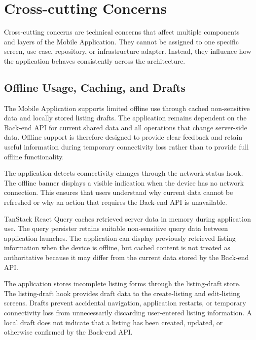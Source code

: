 \section{Cross-cutting Concerns}
\label{sec:cross-cutting-concerns}
Cross-cutting concerns are technical concerns that affect multiple components and layers of the \tradesq{} Mobile Application.
They cannot be assigned to one specific screen, use case, repository, or infrastructure adapter.
Instead, they influence how the application behaves consistently across the architecture.

\subsection{Offline Usage, Caching, and Drafts}
\label{sec:offline}

The \tradesq{} Mobile Application supports limited offline use through cached non-sensitive data and locally stored listing drafts.
The application remains dependent on the \tradesq{} Back-end API for current shared data and all operations that change server-side data.
Offline support is therefore designed to provide clear feedback and retain useful information during temporary connectivity loss rather than to provide full offline functionality.

The application detects connectivity changes through the network-status hook.
The offline banner displays a visible indication when the device has no network connection.
This ensures that users understand why current data cannot be refreshed or why an action that requires the Back-end API is unavailable.

TanStack React Query caches retrieved server data in memory during application use.
The query persister retains suitable non-sensitive query data between application launches.
The application can display previously retrieved listing information when the device is offline, but cached content is not treated as authoritative because it may differ from the current data stored by the \tradesq{} Back-end API.

The application stores incomplete listing forms through the listing-draft store.
The listing-draft hook provides draft data to the create-listing and edit-listing screens.
Drafts prevent accidental navigation, application restarts, or temporary connectivity loss from unnecessarily discarding user-entered listing information.
A local draft does not indicate that a listing has been created, updated, or otherwise confirmed by the \tradesq{} Back-end API.

